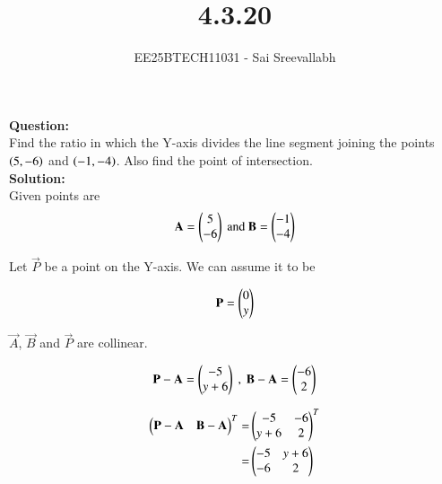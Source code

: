 \documentclass[journal]{IEEEtran}
\begin{document}

\vspace{3cm}

\title{4.3.20}
\author {EE25BTECH11031 - Sai Sreevallabh}
{\let\newpage\relax\maketitle}

\renewcommand{\thefigure}{\theenumi}
\renewcommand{\thetable}{\theenumi}
\setlength{\intextsep}{10pt} %


\renewcommand{\thetable}{\theenumi}

\textbf{Question: }\\

Find the ratio in which the Y-axis divides the line segment joining the points $\left(5,-6\right)$ and $\left(-1,-4\right)$. Also find the point of intersection. \\

\textbf{Solution: }\\

Given points are\\
\begin{align}
    \mathbf{A}=\begin{pmatrix}5\\-6\end{pmatrix} \ \text{and}\  \mathbf{B}=\begin{pmatrix}-1\\-4\end{pmatrix}
\end{align}

Let $\vec{P}$ be a point on the Y-axis. We can assume it to be

\begin{align}
    \mathbf{P}=\begin{pmatrix}0\\y\end{pmatrix}
\end{align}

$\vec{A}$, $\vec{B}$ and $\vec{P}$ are collinear. 

\begin{align}
    \vec{P}-\vec{A}=\myvec{-5 \\ y+6} \ , \ 
    \vec{B}-\vec{A}=\myvec{-6\\2}  
\end{align}

\begin{align}
    \begin{pmatrix}\mathbf{P}-\mathbf{A} & \mathbf{B}-\mathbf{A}\end{pmatrix}^T =& \begin{pmatrix}-5 & -6\\ y+6 & 2\end{pmatrix}^T\\
    =& \begin{pmatrix}-5 & y+6 \\ -6 & 2\end{pmatrix}
\end{align}
\end{document}
